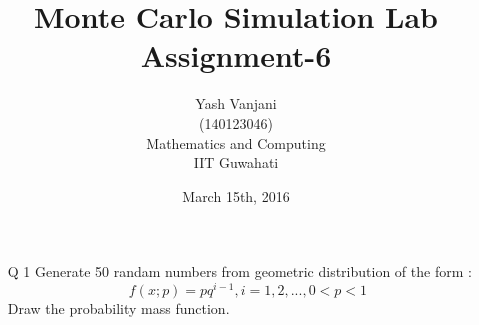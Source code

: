 \documentclass[12pt]{book}
\begin{document}
\title{\textbf{Monte Carlo Simulation Lab\\Assignment-6}}	
\author{Yash Vanjani\\(140123046)\\Mathematics and Computing\\IIT Guwahati}
\date{March 15th, 2016}

\maketitle

\newpage
\begin{enumerate}
\item[Q 1] Generate 50 randam numbers from geometric distribution of the form :
$$f (x; p) = pq^{i-1} , i = 1, 2, . . . , 0 < p < 1$$
Draw the probability mass function.
\end{enumerate}
\end{document}
